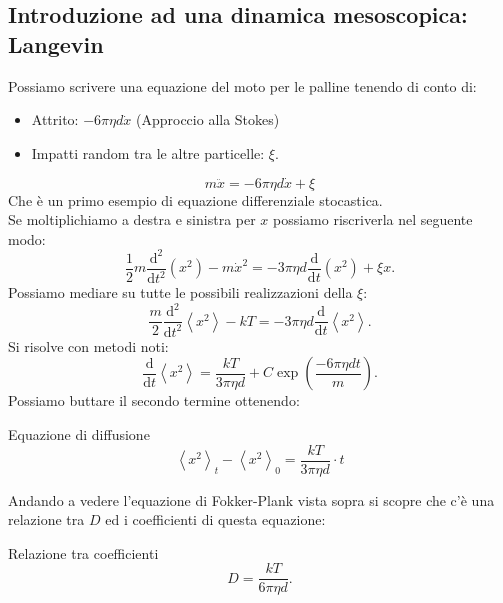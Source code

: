 \subsection{Introduzione ad una dinamica mesoscopica: Langevin}%
Possiamo scrivere una equazione del moto per le palline tenendo di conto di:
\begin{itemize}
    \item Attrito: $-6\pi\eta d \dot{x}$ (Approccio alla Stokes) 
    \item Impatti random tra le altre particelle: $\xi$.
\end{itemize}
\begin{equation}
    m\ddot{x} = -6\pi\eta d \dot{x} + \xi
\end{equation}
Che è un primo esempio di equazione differenziale stocastica.\\
Se moltiplichiamo a destra e sinistra per $x$  possiamo riscriverla nel seguente modo:
\[
    \frac{1}{2}m\frac{\text{d} ^2}{\text{d} t^2}\left(x^2\right) - m\dot{x}^2 = -3\pi\eta d \frac{\text{d} }{\text{d} t}\left(x^2\right) + \xi x
.\] 
Possiamo mediare su tutte le possibili realizzazioni della $\xi$:
\[
    \frac{m}{2}\frac{\text{d} ^2}{\text{d} t^2} \left<x^2\right>-kT = -3\pi\eta d \frac{\text{d} }{\text{d} t} \left<x^2\right>
.\] 
Si risolve con metodi noti:
\[
    \frac{\text{d} }{\text{d} t} \left<x^2\right>=\frac{kT}{3\pi\eta d}+ C\exp\left(\frac{-6\pi\eta dt}{m}\right)
.\] 
Possiamo buttare il secondo termine ottenendo:
\begin{redbox}{Equazione di diffusione}
    \begin{equation}
       \left<x^2\right>_t-\left<x^2\right>_0 = \frac{kT}{3\pi\eta d}\cdot t
    \end{equation}
\end{redbox}
Andando a vedere l'equazione di Fokker-Plank vista sopra si scopre che c'è una relazione tra $D$  ed i coefficienti di questa equazione:
\begin{bluebox}{Relazione tra coefficienti}
    \[
        D = \frac{kT}{6\pi\eta d}
    .\] 
\end{bluebox}
